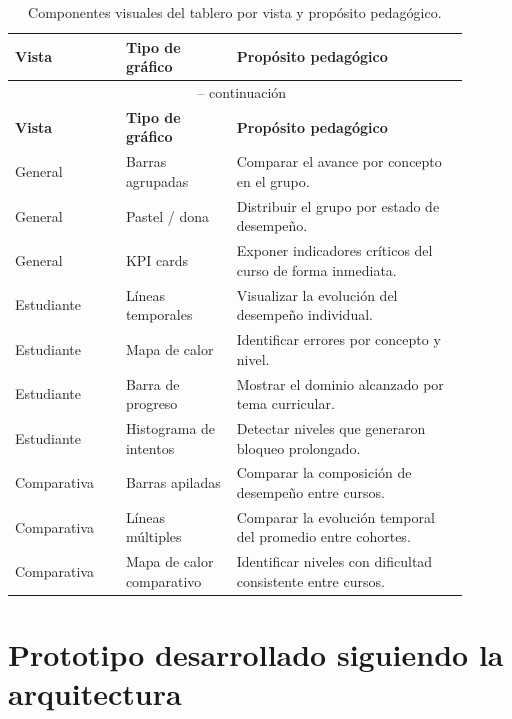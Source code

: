 \begin{longtable}{|p{0.22\linewidth}|p{0.22\linewidth}|p{0.46\linewidth}|}
	\caption{Componentes visuales del tablero por vista y propósito pedagógico.}
	\label{tab:charts} \\
	\hline
	\textbf{Vista} & \textbf{Tipo de gráfico} & \textbf{Propósito pedagógico} \\
	\hline
	\endfirsthead
	\multicolumn{3}{c}{\tablename\ \thetable\ -- continuación} \\
	\hline
	\textbf{Vista} & \textbf{Tipo de gráfico} & \textbf{Propósito pedagógico} \\
	\hline
	\endhead
	\hline
	\endfoot
	\hline
	\endlastfoot
	General & Barras agrupadas & Comparar el avance por concepto en el grupo. \\ \hline
	General & Pastel / dona & Distribuir el grupo por estado de desempeño. \\ \hline
	General & KPI cards & Exponer indicadores críticos del curso de forma inmediata. \\ \hline
	Estudiante & Líneas temporales & Visualizar la evolución del desempeño individual. \\ \hline
	Estudiante & Mapa de calor & Identificar errores por concepto y nivel. \\ \hline
	Estudiante & Barra de progreso & Mostrar el dominio alcanzado por tema curricular. \\ \hline
	Estudiante & Histograma de intentos & Detectar niveles que generaron bloqueo prolongado. \\ \hline
	Comparativa & Barras apiladas & Comparar la composición de desempeño entre cursos. \\ \hline
	Comparativa & Líneas múltiples & Comparar la evolución temporal del promedio entre cohortes. \\ \hline
	Comparativa & Mapa de calor comparativo & Identificar niveles con dificultad consistente entre cursos. \\ \hline
\end{longtable}


\section{Prototipo desarrollado siguiendo la arquitectura}

